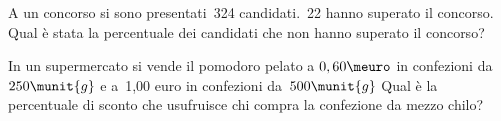 \begin{htmulticols}{2}
\begin{esercizio}
\label{ese:3.189}
 A un concorso si sono presentati~324 candidati.~22 hanno superato il
concorso. Qual è stata la percentuale dei candidati che non hanno
superato il concorso? \sol{\dots}
\end{esercizio}

% 

\begin{esercizio}
\label{ese:3.192}
In un supermercato si vende il pomodoro pelato a \(0,60\meuro\) in
confezioni da~\(250\munit{g}\) e a~1,00 euro in confezioni 
da~\(500\munit{g}\) 
Qual è la percentuale di sconto che usufruisce chi compra la confezione da 
mezzo chilo? \sol{\dots}
\end{esercizio}


% 


\end{htmulticols}
